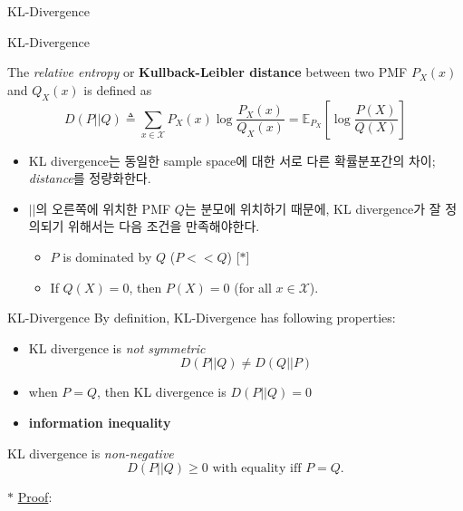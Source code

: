 \documentclass[9pt]{beamer}
\begin{document}
    \begin{section}{KL-Divergence}
        \begin{frame}{KL-Divergence}
            \begin{definition}[KL-divergence]
                The \textit{relative entropy} or \textbf{Kullback-Leibler distance} between two PMF $P_X(x)$ and $Q_X(x)$ is defined as 
                $$D(P || Q) \triangleq \sum_{x \in \mathcal X} P_X(x) \log \frac{P_X(x)}{Q_X(x)} =\mathbb{E}_{P_X}\left[\log \frac{P(X)}{Q(X)}\right] $$
            \end{definition}
            \begin{itemize}
                \item KL divergence는 동일한 sample space에 대한 서로 다른 확률분포간의 차이; \textit{distance}를 정량화한다.
                \item $||$의 오른쪽에 위치한 PMF $Q$는 분모에 위치하기 때문에, KL divergence가 잘 정의되기 위해서는 다음 조건을 만족해야한다.
                \begin{itemize}
                    \item $P$ is dominated by $Q$ ($P<<Q$) [$\ast$] %
                    \item If $Q(X) = 0$, then $P(X)=0$ (for all $x \in \mathcal X$).
                \end{itemize}
            \end{itemize}
        \end{frame}

        \begin{frame}{KL-Divergence}
            By definition, KL-Divergence has following properties:
            \begin{itemize}
                \item KL divergence is \textit{not symmetric}
                $$D(P||Q) \ne D(Q||P)$$
                \item when $P=Q$, then KL divergence is $D(P||Q)=0$
                \item \textbf{information inequality}
            \end{itemize}

            \begin{theorem}
                KL divergence is \textit{non-negative}
                $$ D(P||Q) \ge 0 \text{ with equality iff } P=Q.$$
            \end{theorem}
            $\ast$ \underline{Proof}:
            \vspace{2cm}
        \end{frame}

    \end{section}
\end{document}
